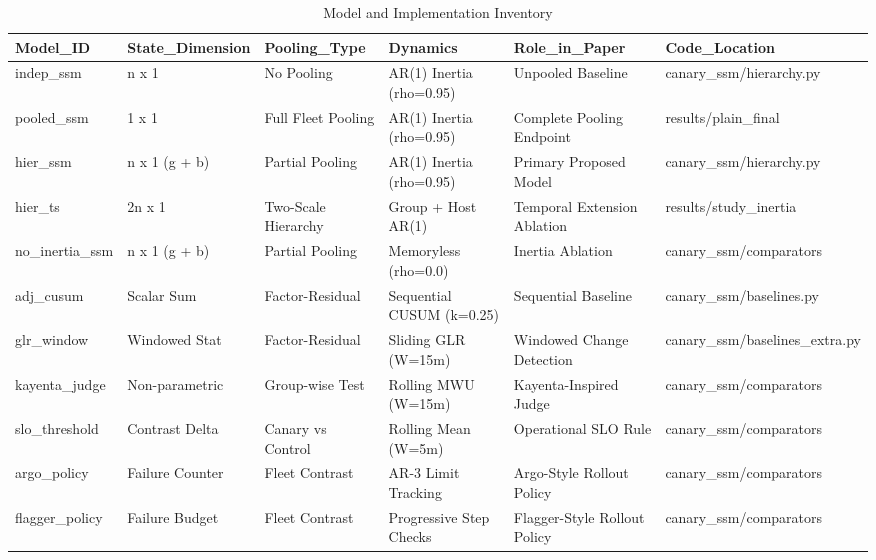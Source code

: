 \begin{table}[htbp]
\centering
\caption{Model and Implementation Inventory}
\label{tab:table_T1_model_glossary}
\begin{tabular}{llllll}
\hline
Model\_ID & State\_Dimension & Pooling\_Type & Dynamics & Role\_in\_Paper & Code\_Location \\
\hline
indep\_ssm & n x 1 & No Pooling & AR(1) Inertia (rho=0.95) & Unpooled Baseline & canary\_ssm/hierarchy.py \\
pooled\_ssm & 1 x 1 & Full Fleet Pooling & AR(1) Inertia (rho=0.95) & Complete Pooling Endpoint & results/plain\_final \\
hier\_ssm & n x 1 (g + b) & Partial Pooling & AR(1) Inertia (rho=0.95) & Primary Proposed Model & canary\_ssm/hierarchy.py \\
hier\_ts & 2n x 1 & Two-Scale Hierarchy & Group + Host AR(1) & Temporal Extension Ablation & results/study\_inertia \\
no\_inertia\_ssm & n x 1 (g + b) & Partial Pooling & Memoryless (rho=0.0) & Inertia Ablation & canary\_ssm/comparators \\
adj\_cusum & Scalar Sum & Factor-Residual & Sequential CUSUM (k=0.25) & Sequential Baseline & canary\_ssm/baselines.py \\
glr\_window & Windowed Stat & Factor-Residual & Sliding GLR (W=15m) & Windowed Change Detection & canary\_ssm/baselines\_extra.py \\
kayenta\_judge & Non-parametric & Group-wise Test & Rolling MWU (W=15m) & Kayenta-Inspired Judge & canary\_ssm/comparators \\
slo\_threshold & Contrast Delta & Canary vs Control & Rolling Mean (W=5m) & Operational SLO Rule & canary\_ssm/comparators \\
argo\_policy & Failure Counter & Fleet Contrast & AR-3 Limit Tracking & Argo-Style Rollout Policy & canary\_ssm/comparators \\
flagger\_policy & Failure Budget & Fleet Contrast & Progressive Step Checks & Flagger-Style Rollout Policy & canary\_ssm/comparators \\
\hline
\end{tabular}
\end{table}
